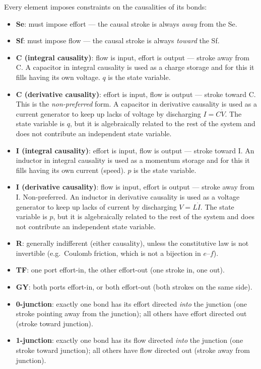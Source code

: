 Every element imposes constraints on the causalities of its bonds:
\begin{itemize}[leftmargin=2em,itemsep=3pt]
  \item \textbf{Se}: must impose effort — the causal stroke is always \emph{away} from the Se.
  \item \textbf{Sf}: must impose flow — the causal stroke is always \emph{toward} the Sf.
  \item \textbf{C (integral causality)}: flow is input, effort is output — stroke away from C. A capacitor in integral causality is used as a charge storage and for this it fills having its own voltage. $q$ is the state variable.
  \item \textbf{C (derivative causality)}: effort is input, flow is output — stroke toward C. This is the \emph{non-preferred} form. A capacitor in derivative causality is used as a current generator to keep up lacks of voltage by discharging $I=C\dot{V}$. The state variable is $q$, but it is algebraically related to the rest of the system and does not contribute an independent state variable.
  \item \textbf{I (integral causality)}: effort is input, flow is output — stroke toward I. An inductor in integral causality is used as a momentum storage and for this it fills having its own current (speed). $p$ is the state variable.
  \item \textbf{I (derivative causality)}: flow is input, effort is output — stroke away from I. Non-preferred. An inductor in derivative causality is used as a voltage generator to keep up lacks of current by discharging $V=L\dot{I}$.
  The state variable is $p$, but it is algebraically related to the rest of the system and does not contribute an independent state variable.
  \item \textbf{R}: generally indifferent (either causality), unless the constitutive law is not invertible (e.g.\ Coulomb friction, which is not a bijection in $e$--$f$).
  \item \textbf{TF}: one port effort-in, the other effort-out (one stroke in, one out).
  \item \textbf{GY}: both ports effort-in, or both effort-out (both strokes on the same side).
  \item \textbf{0-junction}: exactly one bond has its effort directed \emph{into} the junction (one stroke pointing away from the junction); all others have effort directed out (stroke toward junction).
  \item \textbf{1-junction}: exactly one bond has its flow directed \emph{into} the junction (one stroke toward junction); all others have flow directed out (stroke away from junction).
\end{itemize}

